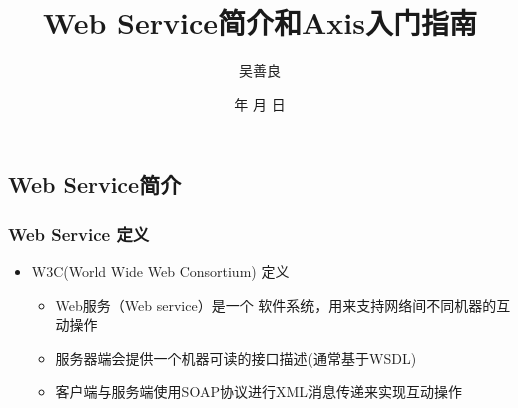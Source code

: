 \documentclass[CJKutf8,compress,hyperref]{beamer}
\renewcommand{\today}{\number\year 年 \number\month 月 \number\day 日}
\begin{document}
\begin{CJK}{UTF8}{song}
         
        \title{ Web Service简介和Axis入门指南}
        \author{ 吴善良}
        \date{ \today}



        \frame{\titlepage}
        \tableofcontents
        \section{ Web Service简介}

        \begin{frame}
                \frametitle{ Web Service 定义}
                \begin{itemize}

                        \item W3C(World Wide Web Consortium) 定义\cite{WebServiceDefinition}
                                \begin{itemize}
                                        \item Web服务（Web service）是一个 {\color{red}软件系统}，用来支持{\color{red}网络间不同机器的互动操作}
                                        \item 服务器端会提供一个机器可读的{\color{red}接口}描述(通常基于WSDL)
                                        \item 客户端与服务端使用SOAP协议进行XML消息传递来实现互动操作
                                \end{itemize}
                \end{itemize}
        \end{frame}


\end{CJK}
\end{document}
